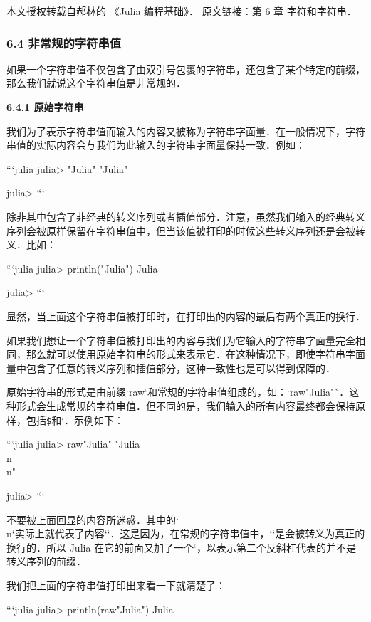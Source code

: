 
本文授权转载自郝林的 《Julia 编程基础》． 原文链接：\href{https://github.com/hyper0x/JuliaBasics/blob/master/book/ch06.md}{第 6 章 字符和字符串}．


\subsubsection{6.4 非常规的字符串值}

如果一个字符串值不仅包含了由双引号包裹的字符串，还包含了某个特定的前缀，那么我们就说这个字符串值是非常规的．

\textbf{6.4.1 原始字符串}

我们为了表示字符串值而输入的内容又被称为字符串字面量．在一般情况下，字符串值的实际内容会与我们为此输入的字符串字面量保持一致．例如：

```julia
julia> "Julia\n\n"
"Julia\n\n"

julia> 
```

除非其中包含了非经典的转义序列或者插值部分．注意，虽然我们输入的经典转义序列会被原样保留在字符串值中，但当该值被打印的时候这些转义序列还是会被转义．比如：

```julia
julia> println("Julia\n\n")
Julia



julia> 
```

显然，当上面这个字符串值被打印时，在打印出的内容的最后有两个真正的换行．

如果我们想让一个字符串值被打印出的内容与我们为它输入的字符串字面量完全相同，那么就可以使用原始字符串的形式来表示它．在这种情况下，即使字符串字面量中包含了任意的转义序列和插值部分，这种一致性也是可以得到保障的．

原始字符串的形式是由前缀`raw`和常规的字符串值组成的，如：`raw"Julia\n\n"`．这种形式会生成常规的字符串值．但不同的是，我们输入的所有内容最终都会保持原样，包括\verb|$|和`\`．示例如下：

```julia
julia> raw"Julia\n\n"
"Julia\\n\\n"

julia> 
```

不要被上面回显的内容所迷惑．其中的`\\n`实际上就代表了内容`\n`．这是因为，在常规的字符串值中，`\n`是会被转义为真正的换行的．所以 Julia 在它的前面又加了一个`\`，以表示第二个反斜杠代表的并不是转义序列的前缀．

我们把上面的字符串值打印出来看一下就清楚了：

```julia
julia> println(raw"Julia\n\n")
Julia\n\n

